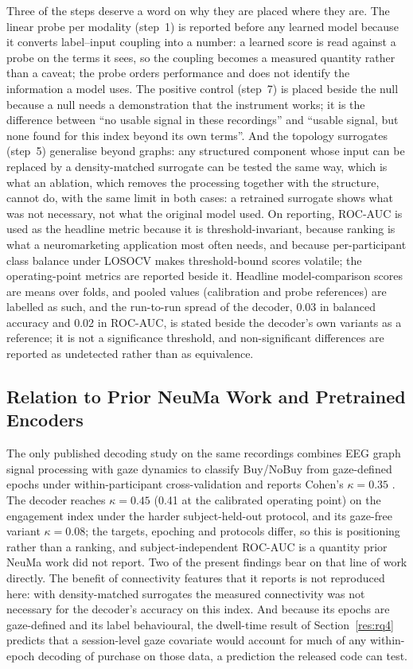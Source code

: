 Three of the steps deserve a word on why they are placed where they are. The linear probe per modality (step~1) is reported before any learned model because it converts label--input coupling into a number: a learned score is read against a probe on the terms it sees, so the coupling becomes a measured quantity rather than a caveat; the probe orders performance and does not identify the information a model uses. The positive control (step~7) is placed beside the null because a null needs a demonstration that the instrument works; it is the difference between ``no usable signal in these recordings'' and ``usable signal, but none found for this index beyond its own terms''. And the topology surrogates (step~5) generalise beyond graphs: any structured component whose input can be replaced by a density-matched surrogate can be tested the same way, which is what an ablation, which removes the processing together with the structure, cannot do, with the same limit in both cases: a retrained surrogate shows what was not necessary, not what the original model used. On reporting, ROC-AUC is used as the headline metric because it is threshold-invariant, because ranking is what a neuromarketing application most often needs, and because per-participant class balance under LOSOCV makes threshold-bound scores volatile; the operating-point metrics are reported beside it. Headline model-comparison scores are means over folds, and pooled values (calibration and probe references) are labelled as such, and the run-to-run spread of the decoder, 0.03 in balanced accuracy and 0.02 in ROC-AUC, is stated beside the decoder's own variants as a reference; it is not a significance threshold, and non-significant differences are reported as undetected rather than as equivalence.

\subsection{Relation to Prior NeuMa Work and Pretrained Encoders}\label{disc:prior}

The only published decoding study on the same recordings combines EEG graph signal processing with gaze dynamics to classify Buy/NoBuy from gaze-defined epochs under within-participant cross-validation and reports Cohen's $\kappa=0.35$ \cite{ref18}. The decoder reaches $\kappa=0.45$ (0.41 at the calibrated operating point) on the engagement index under the harder subject-held-out protocol, and its gaze-free variant $\kappa=0.08$; the targets, epoching and protocols differ, so this is positioning rather than a ranking, and subject-independent ROC-AUC is a quantity prior NeuMa work did not report. Two of the present findings bear on that line of work directly. The benefit of connectivity features that it reports is not reproduced here: with density-matched surrogates the measured connectivity was not necessary for the decoder's accuracy on this index. And because its epochs are gaze-defined and its label behavioural, the dwell-time result of Section~\ref{res:rq4} predicts that a session-level gaze covariate would account for much of any within-epoch decoding of purchase on those data, a prediction the released code can test.

